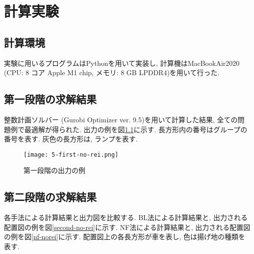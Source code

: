 \chapter{計算実験}\label{computational_result}
\section{計算環境}
実験に用いるプログラムはPythonを用いて実装し, 計算機はMacBookAir2020 (CPU: 8 コア Apple M1 chip, メモリ: 8 GB LPDDR4)を用いて行った. 

\section{第一段階の求解結果}
整数計画ソルバー (Gurobi Optimizer ver. 9.5)を用いて計算した結果, 全ての問題例で最適解が得られた. 
出力の例を図\ref{first-no-rei}に示す. 
長方形内の番号はグループの番号を表す. 
灰色の長方形は, ランプを表す. \\

\begin{figure}[b]
    \texttt{[image: 5-first-no-rei.png]}
    \caption{第一段階の出力の例}
    \label{first-no-rei}
\end{figure}
\clearpage


\section{第二段階の求解結果}
各手法による計算結果と出力図を比較する. 
BL法による計算結果と, 出力される配置図の例を図\ref{second-no-rei}に示す. 
NF法による計算結果と, 出力される配置図の例を図\ref{nf-norei}に示す. 
配置図上の各長方形が車を表し, 色は揚げ地の種類を表す. 

